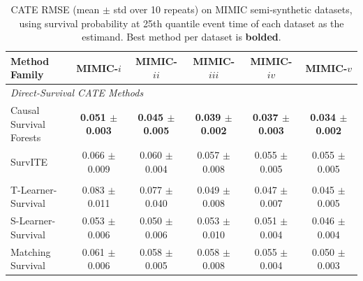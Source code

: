 \documentclass{article} %
\begin{document}
\begin{table}[!ht]
\centering
\footnotesize
\setlength{\tabcolsep}{4pt}
\caption{CATE RMSE (mean $\pm$ std over 10 repeats) on MIMIC semi-synthetic datasets, using survival probability at 25th quantile event time of each dataset as the estimand. Best method per dataset is \textbf{bolded}.}
\label{tab:cate_rmse_prob25}
        \begin{subtable}{\linewidth}
        \centering
        \begin{tabular}{lccccc}
        \toprule
        \textbf{Method Family} & \textbf{MIMIC-$i$} & \textbf{MIMIC-$ii$} & \textbf{MIMIC-$iii$} & \textbf{MIMIC-$iv$} & \textbf{MIMIC-$v$} \\
        \midrule
        \multicolumn{6}{l}{\textit{Direct-Survival CATE Methods}} \\
                Causal Survival Forests & \textbf{0.051 $\pm$ 0.003} & \textbf{0.045 $\pm$ 0.005} & \textbf{0.039 $\pm$ 0.002} & \textbf{0.037 $\pm$ 0.003} & \textbf{0.034 $\pm$ 0.002} \\ 
                SurvITE & 0.066 $\pm$ 0.009 & 0.060 $\pm$ 0.004 & 0.057 $\pm$ 0.008 & 0.055 $\pm$ 0.005 & 0.055 $\pm$ 0.005 \\ 
        \addlinespace
        \multicolumn{6}{l}{\textit{Survival Meta-Learners}} \\
                T-Learner-Survival & 0.083 $\pm$ 0.011 & 0.077 $\pm$ 0.040 & 0.049 $\pm$ 0.008 & 0.047 $\pm$ 0.007 & 0.045 $\pm$ 0.005 \\ 
                S-Learner-Survival & 0.053 $\pm$ 0.006 & 0.050 $\pm$ 0.006 & 0.053 $\pm$ 0.010 & 0.051 $\pm$ 0.004 & 0.046 $\pm$ 0.004 \\ 
                Matching Survival & 0.061 $\pm$ 0.006 & 0.058 $\pm$ 0.005 & 0.058 $\pm$ 0.008 & 0.055 $\pm$ 0.004 & 0.050 $\pm$ 0.003 \\ 
        \bottomrule
        \end{tabular}
        \end{subtable}

        \vspace{0.6em}


\end{table}
\end{document}
